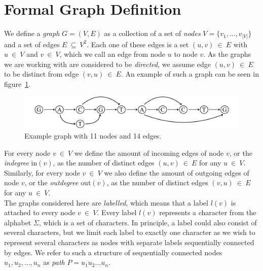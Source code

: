 \documentclass[a4paper,12pt,twoside,BCOR=10mm]{scrbook}
\begin{document}
\section{Formal Graph Definition}
\label{sec:graph_definition}
%
We define a \textit{graph} $ G = (V, E) $ as a collection of a set
of \textit{nodes} $ V = \{ v_1, ..., v_{|V|} \} $ and a set of edges $ E {\: \subseteq \:} V^2 $.
Each one of these edges is a set $ (u, v) {\: \in \:} E $ with $ u {\: \in \:} V $ and $ v {\: \in \:} V $,
which we call an edge from node $ u $ to node $ v $.
As the graphs we are working with are considered to be \textit{directed},
we assume edge $ (u, v) {\: \in \:} E $ to
be distinct from edge $ (v, u) {\: \in \:} E $.
An example of such a graph can be seen in figure~\ref{fig:evo_fig_graph_example}. \\
\begin{figure}[!htb]
\centering
\includegraphics[width=\textwidth]{evo_fig_graph_example.pdf}
\caption[Example graph]{Example graph with 11 nodes and 14 edges.} \label{fig:evo_fig_graph_example}
\end{figure}
For every node $ v {\: \in \:} V $ we define the amount of incoming edges of
node $ v $, or the \textit{indegree} $ \textrm{in} ( v ) $, as the number of
distinct edges $ (u, v) {\: \in \:} E $ for any $ u {\: \in \:} V $.
Similarly, for every node $ v {\: \in \:} V $ we also define the amount of outgoing edges of
node $ v $, or the \textit{outdegree} $ \textrm{out} ( v ) $, as the number of
distinct edges $ (v, u) {\: \in \:} E $ for any $ u {\: \in \:} V $. \\
The graphs considered here are \textit{labelled}, which means that a label $ l( v ) $ is attached
to every node $ v {\: \in \:} V $.
Every label $ l( v ) $ represents a character
from the alphabet $ \Sigma $, which is a set of characters.
In principle, a label could also consist of several characters,
but we limit each label to exactly one character as we wish to
represent several characters as nodes with separate labels sequentially connected by edges.
We refer to such a structure of sequentially connected
nodes $ u_1, u_2, ..., u_n $ as \textit{path} $ P = u_1 u_2 ... u_n $.
\end{document}
